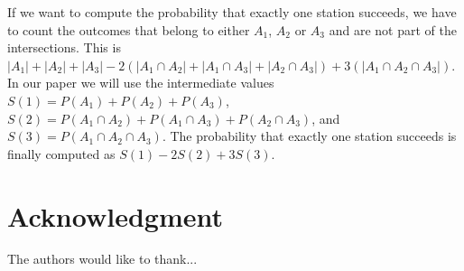 \documentclass[journal]{IEEEtran}
\begin{document}
If we want to compute the probability that exactly one station succeeds, we have to count the outcomes that belong to either $A_1$, $A_2$ or $A_3$ and are not part of the intersections.
This is $|A_1|+|A_2|+|A_3|-2(|A_1\cap A_2|+|A_1\cap A_3|+|A_2\cap A_3|)+3(|A_1\cap A_2\cap A_3|)$.
In our paper we will use the intermediate values
 $S(1)=P(A_1)+P(A_2)+P(A_3)$,
 $S(2)=P(A_1\cap A_2)+P(A_1\cap A_3)+P(A_2\cap A_3)$, and $S(3)=P(A_1\cap A_2\cap A_3)$.
 The probability that exactly one station succeeds is finally computed  as $S(1)-2S(2)+3S(3)$.


\section*{Acknowledgment}


The authors would like to thank...


\ifCLASSOPTIONcaptionsoff
  \newpage
\fi







%



%
\end{document}
